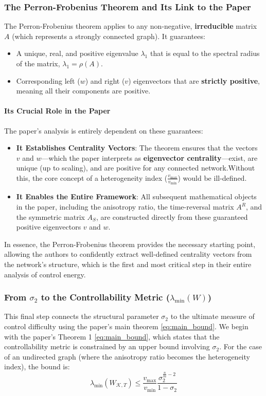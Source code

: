\documentclass[10pt, a4paper]{article}
\begin{document}
\subsubsection*{The Perron-Frobenius Theorem and Its Link to the Paper}
The Perron-Frobenius theorem applies to any non-negative, \textbf{irreducible} matrix $A$ (which represents a strongly connected graph). It guarantees:
\begin{itemize}
    \item A unique, real, and positive eigenvalue $\lambda_1$ that is equal to the spectral radius of the matrix, $\lambda_1 = \rho(A)$.
    \item Corresponding left ($w$) and right ($v$) eigenvectors that are \textbf{strictly positive}, meaning all their components are positive.
\end{itemize}

\paragraph{Its Crucial Role in the Paper}

The paper's analysis is entirely dependent on these guarantees:

\begin{itemize}
    \item \textbf{It Establishes Centrality Vectors}: The theorem ensures that the vectors $v$ and $w$---which the paper interprets as \textbf{eigenvector centrality}---exist, are unique (up to scaling), and are positive for any connected network.Without this, the core concept of a heterogeneity index ($\frac{v_{\max}}{v_{\min}}$) would be ill-defined.

    \item \textbf{It Enables the Entire Framework}: All subsequent mathematical objects in the paper, including the anisotropy ratio, the time-reversal matrix $A^R$, and the symmetric matrix $A_S$, are constructed directly from these guaranteed positive eigenvectors $v$ and $w$.
\end{itemize}

In essence, the Perron-Frobenius theorem provides the necessary starting point, allowing the authors to confidently extract well-defined centrality vectors from the network's structure, which is the first and most critical step in their entire analysis of control energy.
\subsubsection{From $\sigma_2$ to the Controllability Metric ($\lambda_{\min}(W)$)}
This final step connects the structural parameter $\sigma_2$ to the ultimate measure of control difficulty using the paper's main theorem \ref{eq:main_bound}.
We begin with the paper's Theorem 1 \ref{eq:main_bound}, which states that the controllability metric is constrained by an upper bound involving $\sigma_2$. For the case of an undirected graph (where the anisotropy ratio becomes the heterogeneity index), the bound is:
\begin{equation}
    \lambda_{\min}(W_{\mathcal{K},T}) \le \frac{v_{\max}}{v_{\min}}\frac{\sigma_{2}^{\frac{n}{m}-2}}{1-\sigma_{2}}
\end{equation}
\end{document}
